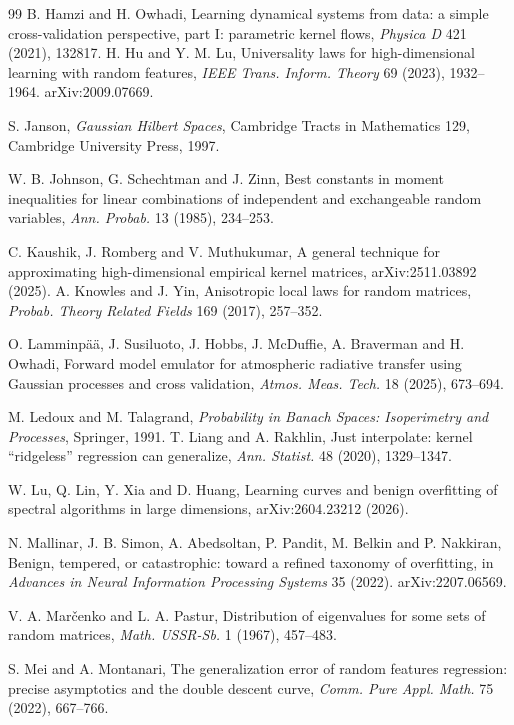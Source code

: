 \documentclass[11pt]{article}
\theoremstyle{definition}
\begin{document}
\begin{thebibliography}{99}
 B. Hamzi and H. Owhadi, Learning dynamical systems from data: a simple cross-validation perspective, part I: parametric kernel flows, \emph{Physica D} 421 (2021), 132817.
 H. Hu and Y. M. Lu, Universality laws for high-dimensional learning with random
features, \emph{IEEE Trans. Inform. Theory} 69 (2023), 1932--1964. arXiv:2009.07669.


 S. Janson, \emph{Gaussian Hilbert Spaces}, Cambridge Tracts in Mathematics 129, Cambridge University Press, 1997.

 W. B. Johnson, G. Schechtman and J. Zinn, Best constants in moment inequalities for linear combinations of independent and exchangeable random variables, \emph{Ann. Probab.} 13 (1985), 234--253.

 C. Kaushik, J. Romberg and V. Muthukumar, A general technique for approximating high-dimensional empirical kernel matrices, arXiv:2511.03892 (2025).
 A. Knowles and J. Yin, Anisotropic local laws for random matrices,
\emph{Probab. Theory Related Fields} 169 (2017), 257--352.

 O. Lamminp\"a\"a, J. Susiluoto, J. Hobbs, J. McDuffie, A. Braverman and
H. Owhadi, Forward model emulator for atmospheric radiative transfer using Gaussian processes and
cross validation, \emph{Atmos. Meas. Tech.} 18 (2025), 673--694.


 M. Ledoux and M. Talagrand, \emph{Probability in Banach Spaces: Isoperimetry and Processes}, Springer, 1991.
 T. Liang and A. Rakhlin, Just interpolate: kernel ``ridgeless'' regression
can generalize, \emph{Ann. Statist.} 48 (2020), 1329--1347.

 W. Lu, Q. Lin, Y. Xia and D. Huang, Learning curves and benign overfitting
of spectral algorithms in large dimensions, arXiv:2604.23212 (2026).

 N. Mallinar, J. B. Simon, A. Abedsoltan, P. Pandit, M. Belkin and P. Nakkiran,
Benign, tempered, or catastrophic: toward a refined taxonomy of overfitting, in \emph{Advances in
Neural Information Processing Systems} 35 (2022). arXiv:2207.06569.

 V. A. Mar\v{c}enko and L. A. Pastur, Distribution of eigenvalues for some
sets of random matrices, \emph{Math. USSR-Sb.} 1 (1967), 457--483.

 S. Mei and A. Montanari, The generalization error of random features
regression: precise asymptotics and the double descent curve, \emph{Comm. Pure Appl. Math.} 75
(2022), 667--766.


\end{thebibliography}
\end{document}
